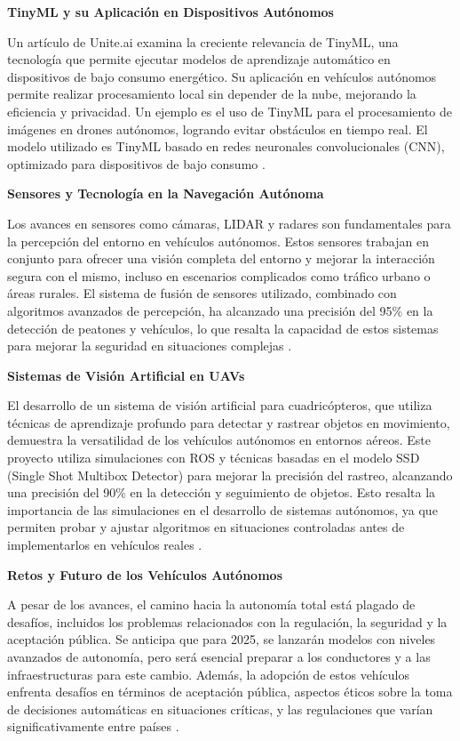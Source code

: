 \textbf{TinyML y su Aplicación en Dispositivos Autónomos}

Un artículo de Unite.ai examina la creciente relevancia de TinyML, una tecnología que permite ejecutar modelos de aprendizaje automático en dispositivos de bajo consumo energético. Su aplicación en vehículos autónomos permite realizar procesamiento local sin depender de la nube, mejorando la eficiencia y privacidad. Un ejemplo es el uso de TinyML para el procesamiento de imágenes en drones autónomos, logrando evitar obstáculos en tiempo real. El modelo utilizado es TinyML basado en redes neuronales convolucionales (CNN), optimizado para dispositivos de bajo consumo \cite{unite2023}.

\textbf{Sensores y Tecnología en la Navegación Autónoma}

Los avances en sensores como cámaras, LIDAR y radares son fundamentales para la percepción del entorno en vehículos autónomos. Estos sensores trabajan en conjunto para ofrecer una visión completa del entorno y mejorar la interacción segura con el mismo, incluso en escenarios complicados como tráfico urbano o áreas rurales. El sistema de fusión de sensores utilizado, combinado con algoritmos avanzados de percepción, ha alcanzado una precisión del 95\% en la detección de peatones y vehículos, lo que resalta la capacidad de estos sistemas para mejorar la seguridad en situaciones complejas \cite{programarfacil2023}.

\textbf{Sistemas de Visión Artificial en UAVs}

El desarrollo de un sistema de visión artificial para cuadricópteros, que utiliza técnicas de aprendizaje profundo para detectar y rastrear objetos en movimiento, demuestra la versatilidad de los vehículos autónomos en entornos aéreos. Este proyecto utiliza simulaciones con ROS y técnicas basadas en el modelo SSD (Single Shot Multibox Detector) para mejorar la precisión del rastreo, alcanzando una precisión del 90\% en la detección y seguimiento de objetos. Esto resalta la importancia de las simulaciones en el desarrollo de sistemas autónomos, ya que permiten probar y ajustar algoritmos en situaciones controladas antes de implementarlos en vehículos reales \cite{escolar2022}.

\textbf{Retos y Futuro de los Vehículos Autónomos}

A pesar de los avances, el camino hacia la autonomía total está plagado de desafíos, incluidos los problemas relacionados con la regulación, la seguridad y la aceptación pública. Se anticipa que para 2025, se lanzarán modelos con niveles avanzados de autonomía, pero será esencial preparar a los conductores y a las infraestructuras para este cambio. Además, la adopción de estos vehículos enfrenta desafíos en términos de aceptación pública, aspectos éticos sobre la toma de decisiones automáticas en situaciones críticas, y las regulaciones que varían significativamente entre países \cite{atrain2023}.

